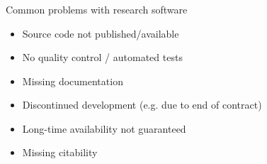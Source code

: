 \documentclass{beamer}
\begin{document}
\begin{frame}
  \frametitle{}
  \begin{block}{}
    \begin{center}
      Common problems with research software\\      
      \begin{itemize}
      \item Source code not published/available
      \item No quality control / automated tests
      \item Missing documentation
      \item Discontinued development (e.g. due to end of contract)
      \item Long-time availability not guaranteed        
      \item Missing citability
      \end{itemize}      
    \end{center}
  \end{block}
\end{frame}
\end{document}

